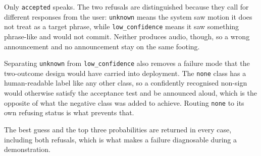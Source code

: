 \noindent Only \texttt{accepted} speaks. The two refusals are distinguished because they call for different responses from the user: \texttt{unknown} means the system saw motion it does not treat as a target phrase, while \texttt{low\_confidence} means it saw something phrase-like and would not commit. Neither produces audio, though, so a wrong announcement and no announcement stay on the same footing.

Separating \texttt{unknown} from \texttt{low\_confidence} also removes a failure mode that the two-outcome design would have carried into deployment. The \texttt{none} class has a human-readable label like any other class, so a confidently recognised non-sign would otherwise satisfy the acceptance test and be announced aloud, which is the opposite of what the negative class was added to achieve. Routing \texttt{none} to its own refusing status is what prevents that.

The best guess and the top three probabilities are returned in every case, including both refusals, which is what makes a failure diagnosable during a demonstration.
